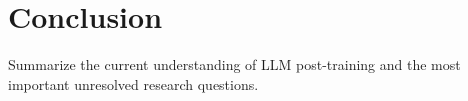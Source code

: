 \section{Conclusion}
Summarize the current understanding of LLM post-training and the most important unresolved
research questions.

